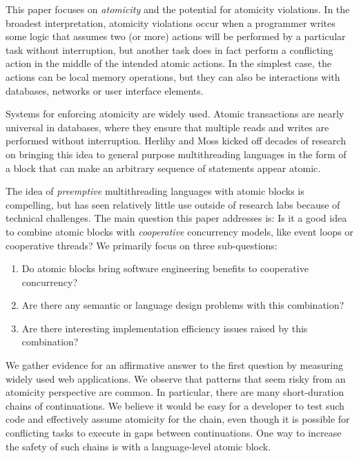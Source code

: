 \documentclass[acmsmall,anonymous,review]{acmart}\settopmatter{printfolios=true,printccs=false,printacmref=false}
\begin{document}

This paper focuses on \emph{atomicity} and the potential for atomicity violations.
In the broadest interpretation, atomicity violations occur when a programmer writes some logic that assumes two (or more) actions will be performed by a particular task without interruption, but another task does in fact perform a conflicting action in the middle of the intended atomic actions.
In the simplest case, the actions can be local memory operations, but they can also be interactions with databases, networks or user interface elements.

Systems for enforcing atomicity are widely used.
Atomic transactions are nearly universal in databases, where they ensure that multiple reads and writes are performed without interruption.
Herlihy and Moss \cite{Herlihy1993} kicked off decades of research on bringing this idea to general purpose multithreading languages in the form of a block that can make an arbitrary sequence of statements appear atomic.


The idea of \emph{preemptive} multithreading languages with atomic blocks is compelling, but has seen relatively little use outside of research labs because of technical challenges.
The main question this paper addresses is: Is it a good idea to combine atomic blocks with \emph{cooperative} concurrency models, like event loops or cooperative threads?
We primarily focus on three sub-questions:
\begin{enumerate}
\item Do atomic blocks bring software engineering benefits to cooperative concurrency?
\item Are there any semantic or language design problems with this combination?
\item Are there interesting implementation efficiency issues raised by this combination?
\end{enumerate}

We gather evidence for an affirmative answer to the first question by measuring widely used web applications\footnotemark{}.
We observe that patterns that seem risky from an atomicity perspective are common.
In particular, there are many short-duration chains of continuations.
We believe it would be easy for a developer to test such code and effectively assume atomicity for the chain, even though it is possible for conflicting tasks to execute in gaps between continuations.
One way to increase the safety of such chains is with a language-level atomic block.
\end{document}
